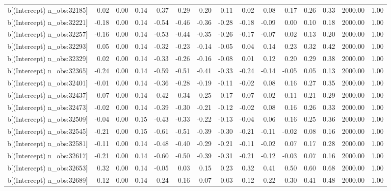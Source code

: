 \begin{table}[ht]
\begin{tabular}{rrrrrrrrrrrrrrr}
  b[(Intercept) n\_obs:32185] & -0.02 & 0.00 & 0.14 & -0.37 & -0.29 & -0.20 & -0.11 & -0.02 & 0.08 & 0.17 & 0.26 & 0.33 & 2000.00 & 1.00 \\ 
  b[(Intercept) n\_obs:32221] & -0.18 & 0.00 & 0.14 & -0.54 & -0.46 & -0.36 & -0.28 & -0.18 & -0.09 & 0.00 & 0.10 & 0.18 & 2000.00 & 1.00 \\ 
  b[(Intercept) n\_obs:32257] & -0.16 & 0.00 & 0.14 & -0.53 & -0.44 & -0.35 & -0.26 & -0.17 & -0.07 & 0.02 & 0.13 & 0.20 & 2000.00 & 1.00 \\ 
  b[(Intercept) n\_obs:32293] & 0.05 & 0.00 & 0.14 & -0.32 & -0.23 & -0.14 & -0.05 & 0.04 & 0.14 & 0.23 & 0.32 & 0.42 & 2000.00 & 1.00 \\ 
  b[(Intercept) n\_obs:32329] & 0.02 & 0.00 & 0.14 & -0.33 & -0.26 & -0.16 & -0.08 & 0.01 & 0.12 & 0.20 & 0.29 & 0.38 & 2000.00 & 1.00 \\ 
  b[(Intercept) n\_obs:32365] & -0.24 & 0.00 & 0.14 & -0.59 & -0.51 & -0.41 & -0.33 & -0.24 & -0.14 & -0.05 & 0.05 & 0.13 & 2000.00 & 1.00 \\ 
  b[(Intercept) n\_obs:32401] & -0.01 & 0.00 & 0.14 & -0.36 & -0.28 & -0.19 & -0.11 & -0.02 & 0.08 & 0.16 & 0.27 & 0.35 & 2000.00 & 1.00 \\ 
  b[(Intercept) n\_obs:32437] & -0.07 & 0.00 & 0.14 & -0.42 & -0.34 & -0.25 & -0.17 & -0.07 & 0.02 & 0.11 & 0.21 & 0.29 & 2000.00 & 1.00 \\ 
  b[(Intercept) n\_obs:32473] & -0.02 & 0.00 & 0.14 & -0.39 & -0.30 & -0.21 & -0.12 & -0.02 & 0.08 & 0.16 & 0.26 & 0.33 & 2000.00 & 1.00 \\ 
  b[(Intercept) n\_obs:32509] & -0.04 & 0.00 & 0.15 & -0.43 & -0.33 & -0.22 & -0.13 & -0.04 & 0.06 & 0.16 & 0.25 & 0.36 & 2000.00 & 1.00 \\ 
  b[(Intercept) n\_obs:32545] & -0.21 & 0.00 & 0.15 & -0.61 & -0.51 & -0.39 & -0.30 & -0.21 & -0.11 & -0.02 & 0.08 & 0.16 & 2000.00 & 1.00 \\ 
  b[(Intercept) n\_obs:32581] & -0.11 & 0.00 & 0.14 & -0.48 & -0.40 & -0.29 & -0.21 & -0.11 & -0.02 & 0.07 & 0.17 & 0.28 & 2000.00 & 1.00 \\ 
  b[(Intercept) n\_obs:32617] & -0.21 & 0.00 & 0.14 & -0.60 & -0.50 & -0.39 & -0.31 & -0.21 & -0.12 & -0.03 & 0.07 & 0.16 & 2000.00 & 1.00 \\ 
  b[(Intercept) n\_obs:32653] & 0.32 & 0.00 & 0.14 & -0.05 & 0.03 & 0.15 & 0.23 & 0.32 & 0.41 & 0.50 & 0.60 & 0.68 & 2000.00 & 1.00 \\ 
  b[(Intercept) n\_obs:32689] & 0.12 & 0.00 & 0.14 & -0.24 & -0.16 & -0.07 & 0.03 & 0.12 & 0.22 & 0.30 & 0.41 & 0.48 & 2000.00 & 1.00 \\ 

\end{tabular}
\end{table}
